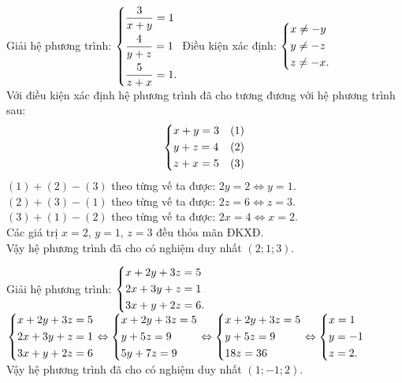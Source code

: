 \begin{ex}%
 Giải hệ phương trình: $\left\{\begin{aligned}& \dfrac{3}{x+y}=1 \\& \dfrac{4}{y+z}=1 \\& \dfrac{5}{z+x}=1.\end{aligned}\right.$
 \loigiai
  {
  Điều kiện xác định: $\left\{\begin{aligned}& x \neq -y \\& y \neq -z \\& z \neq -x.\end{aligned}\right.$\\
  Với điều kiện xác định hệ phương trình đã cho tương đương với hệ phương trình sau:
  $$\left\{\begin{aligned}& x+y=3 & (1) \\& y+z=4 & (2) \\& z+x=5 & (3)\end{aligned}\right.$$
  $(1) + (2) - (3)$ theo từng vế ta được: $2y = 2 \Leftrightarrow y = 1$.\\
  $(2) + (3) - (1)$ theo từng vế ta được: $2z = 6 \Leftrightarrow z = 3$.\\
  $(3) + (1) - (2)$ theo từng vế ta được: $2x = 4 \Leftrightarrow x = 2$.\\
  Các giá trị $x = 2$, $y = 1$, $z = 3$ đều thỏa mãn ĐKXĐ.\\
  Vậy hệ phương trình đã cho có nghiệm duy nhất $(2;1;3)$.
  }
\end{ex}


\begin{ex}%
 Giải hệ phương trình: $\left\{\begin{aligned}& x+2y+3z=5 \\& 2x+3y+z=1 \\& 3x+y+2z=6.\end{aligned}\right.$
 \loigiai
  {
  \allowdisplaybreaks
  $\left\{\begin{aligned}& x+2y+3z=5 \\& 2x+3y+z=1 \\& 3x+y+2z=6\end{aligned}\right.
  \Leftrightarrow \left\{\begin{aligned}& x+2y+3z=5 \\& y+5z=9 \\& 5y+7z=9\end{aligned}\right.
  \Leftrightarrow \left\{\begin{aligned}& x+2y+3z=5 \\& y+5z=9 \\& 18z=36\end{aligned}\right.
  \Leftrightarrow \left\{\begin{aligned}& x = 1 \\& y = -1 \\& z = 2.\end{aligned}\right.$\\
  Vậy hệ phương trình đã cho có nghiệm duy nhất $(1;-1;2)$.
  }
\end{ex}


